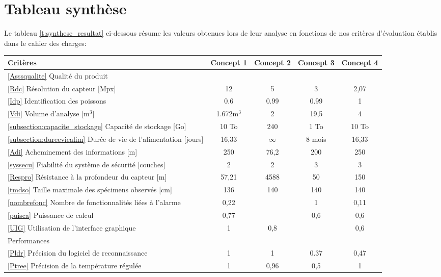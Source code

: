 \section{Tableau synthèse}

Le tableau \ref{t:synthese_resultat} ci-dessous résume les valeurs obtenues lors de leur analyse en fonctions de nos critères d'évaluation établis dans le cahier des charges:


\begin{table}[]
\begin{tabular}{|p{8cm}|c|c|c|c|}
\hline
Critères & Concept 1  & Concept 2 & Concept 3 & Concept 4 \\ \hline
\ref{Asssqualite} Qualité du produit & & & & \\ \hline
\ref{Rdc} Résolution du capteur [Mpx]& 12 & 5 & 3 & 2,07 \\ \hline
\ref{Idp} Identification des poissons & 0.6 & 0.99 & 0.99 & 1 \\ \hline
\ref{Vdi} Volume d'analyse [m$^3$] & 1.672m$^3$ & 2 & 19,5 & 4 \\ \hline
\ref{subsection:capacite_stockage} Capacité de stockage [Go] & 10 To & 240 & 1 To      & 10 To \\ \hline
\ref{subsection:dureeviealim} Durée de vie de l'alimentation [jours] & 16,33 & $\infty$ & 8 mois & 16,33 \\ \hline
\ref{Adi} Acheminement des informations [m] & 250 & 76,2 & 200 & 250 \\ \hline
\ref{syssecu} Fiabilité du système de sécurité [couches] & 2 & 2 & 3 & 3 \\ \hline
\ref{Respro} Résistance à la profondeur du capteur [m] & 57,21 & 4588 & 50 & 150 \\ \hline
\ref{tmdso} Taille maximale des spécimens observés [cm] & 136 & 140 & 140 & 140 \\ \hline
\ref{nombrefonc} Nombre de fonctionnalités liées à l'alarme & 0,22 & & 1 & 0,11 \\ \hline
\ref{puisca} Puissance de calcul & 0,77 & & 0,6 & 0,6 \\ \hline
\ref{UIG} Utilisation de l'interface graphique & 1 & 0,8 & & 0,6 \\ \hline
Performances & & & & \\ \hline
\ref{Pldr} Précision du logiciel de reconnaissance & 1 & 1 & 0.37 & 0,47 \\ \hline
\ref{Ptree} Précision de la température régulée                      & 1          & 0,96      & 0,5       & 1         \\ \hline

\end{tabular}
\end{table}
